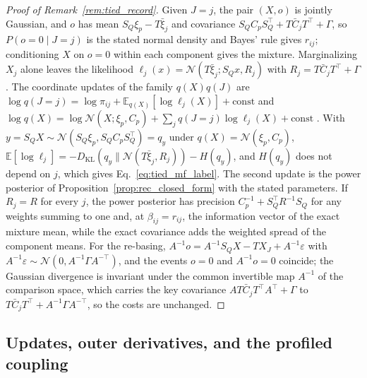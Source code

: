 \documentclass[twoside,11pt]{article}
\begin{document}
\begin{proof}[Proof of Remark~\ref{rem:tied_record}]
Given $J=j$, the pair $(X,o)$ is jointly Gaussian, and $o$ has mean $S_Q\xi_p-T\bar\xi_j$ and covariance $S_QC_pS_Q^\top+T\bar C_jT^\top+\Gamma$, so $P(o=0\mid J=j)$ is the stated normal density and Bayes' rule gives $r_{ij}$; conditioning $X$ on $o=0$ within each component gives the mixture. Marginalizing $X_j$ alone leaves the likelihood $\ell_j(x)=\mathcal N(T\bar\xi_j;S_Qx,R_j)$ with $R_j=T\bar C_jT^\top+\Gamma$. The coordinate updates of the family $q(X)q(J)$ are $\log q(J=j)=\log\pi_{ij}+\mathbb E_{q(X)}[\log\ell_j(X)]+\mathrm{const}$ and $\log q(X)=\log\mathcal N(X;\xi_p,C_p)+\sum_jq(J=j)\log\ell_j(X)+\mathrm{const}$ \citep[Sec.~10.1]{Bishop2006}. With $y=S_QX\sim\mathcal N(S_Q\xi_p,S_QC_pS_Q^\top)=q_y$ under $q(X)=\mathcal N(\xi_p,C_p)$, $\mathbb E[\log\ell_j]=-D_{\mathrm{KL}}(q_y\|\mathcal N(T\bar\xi_j,R_j))-H(q_y)$, and $H(q_y)$ does not depend on $j$, which gives Eq.~\eqref{eq:tied_mf_label}. The second update is the power posterior of Proposition~\ref{prop:rec_closed_form} with the stated parameters. If $R_j=R$ for every $j$, the power posterior has precision $C_p^{-1}+S_Q^\top R^{-1}S_Q$ for any weights summing to one and, at $\beta_{ij}=r_{ij}$, the information vector of the exact mixture mean, while the exact covariance adds the weighted spread of the component means. For the re-basing, $A^{-1}o=A^{-1}S_QX-TX_J+A^{-1}\varepsilon$ with $A^{-1}\varepsilon\sim\mathcal N(0,A^{-1}\Gamma A^{-\top})$, and the events $o=0$ and $A^{-1}o=0$ coincide; the Gaussian divergence is invariant under the common invertible map $A^{-1}$ of the comparison space, which carries the key covariance $AT\bar C_jT^\top A^\top+\Gamma$ to $T\bar C_jT^\top+A^{-1}\Gamma A^{-\top}$, so the costs are unchanged.\end{proof}

\subsection{Updates, outer derivatives, and the profiled coupling}
\label{sec:rec_updates}
\end{document}
